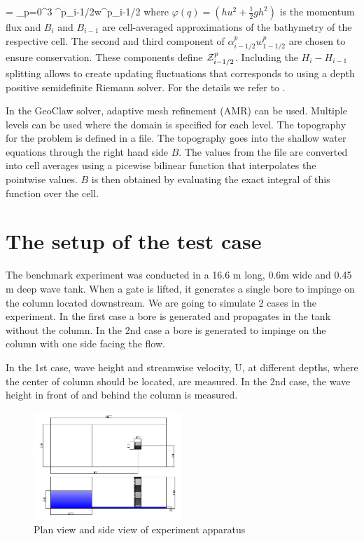 \documentclass[11pt]{article}
\begin{document}
= \sum_{p=0}^3 \alpha^p_{i-1/2}w^p_{i-1/2}
\en
where $\varphi (q) = (hu^2 +\frac{1}{2}gh^2)$ is the momentum flux and $B_i$ and $B_{i-1}$ are cell-averaged approximations of the bathymetry of the respective cell. The second and third component of $\alpha^p_{i-1/2}w^p_{1-1/2}$ are chosen to ensure conservation. These components define ${\cal Z}^p_{i-1/2}$.
Including the $H_i - H_{i-1}$ splitting allows to create updating fluctuations that corresponds to using a depth positive semidefinite Riemann solver. For the details we refer to \cite{DLG}.
\par
In the GeoClaw solver, adaptive mesh refinement (AMR) can be used. Multiple levels can be used where the domain is specified for each level. The topography for the problem is defined in a file. The topography goes into the shallow water equations through the right hand side $B$. The values from the file are converted into cell averages using a picewise bilinear function that interpolates the pointwise values. $B$ is then obtained by evaluating the exact integral of this function over the cell. 
\section{The setup of the test case}\label{Sec:Setup}
The benchmark experiment was conducted in a 16.6 m long, 0.6m wide and 0.45 m deep wave tank. When a gate is lifted, it generates a single bore to impinge on the column located downstream.
We are going to simulate 2 cases in the experiment. In the first case a bore is generated and propagates in the tank without the column. In the 2nd case a bore is generated to impinge on the column with one side facing the flow.
\par
In the 1st case, wave height and streamwise velocity, U, at different depths, where the center of column should be located, are measured. In the 2nd case, the wave height in front of and behind the column is measured.
        \begin{figure}[h!]
            \centering
            \includegraphics[width=0.5\textwidth]{../proposal/figures/Diagram_case}
            \caption{Plan view and side view of experiment apparatus}
        \end{figure}
\end{document}
